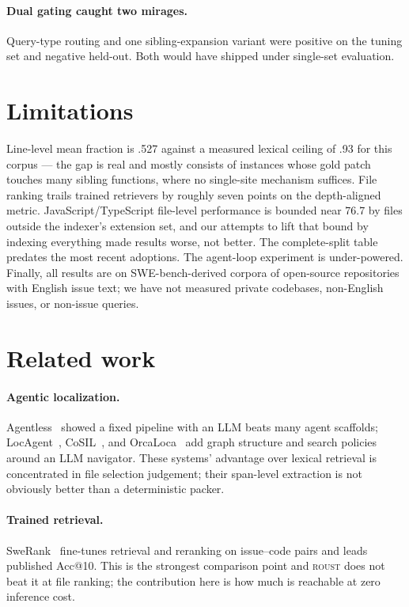 \documentclass[11pt]{article}
\begin{document}
\paragraph{Dual gating caught two mirages.} Query-type routing and one
sibling-expansion variant were positive on the tuning set and negative
held-out. Both would have shipped under single-set evaluation.

\section{Limitations}
\label{sec:limits}

Line-level mean fraction is .527 against a measured lexical ceiling of .93 for
this corpus --- the gap is real and mostly consists of instances whose gold
patch touches many sibling functions, where no single-site mechanism suffices.
File ranking trails trained retrievers by roughly seven points on the
depth-aligned metric. JavaScript/TypeScript file-level performance is bounded
near 76.7 by files outside the indexer's extension set, and our attempts to
lift that bound by indexing everything made results worse, not better. The
complete-split table predates the most recent adoptions. The agent-loop
experiment is under-powered. Finally, all results are on SWE-bench-derived
corpora of open-source repositories with English issue text; we have not
measured private codebases, non-English issues, or non-issue queries.

\section{Related work}
\label{sec:related}

\paragraph{Agentic localization.} Agentless~\cite{agentless} showed a fixed
pipeline with an LLM beats many agent scaffolds; LocAgent~\cite{locagent},
CoSIL~\cite{cosil}, and OrcaLoca~\cite{orcaloca} add graph structure and
search policies around an LLM navigator. These systems' advantage over
lexical retrieval is concentrated in file selection judgement; their
span-level extraction is not obviously better than a deterministic packer.

\paragraph{Trained retrieval.} SweRank~\cite{swerank} fine-tunes retrieval and
reranking on issue--code pairs and leads published Acc@10. This is the
strongest comparison point and \textsc{roust} does not beat it at file
ranking; the contribution here is how much is reachable at zero inference
cost.
\end{document}
